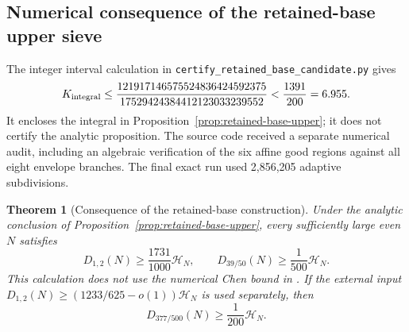 \documentclass[11pt]{article}
\newtheorem{theorem}{Theorem}
\newcommand{\HN}{\mathcal H_N}
\begin{document}
\subsection{Numerical consequence of the retained-base upper sieve}
\label{sec:retained-base-corollary}
The integer interval calculation in
\texttt{certify\_retained\_base\_candidate.py} gives
\[
 K_{\rm integral}\le
 \frac{121917146575524836424592375}{17529424384412123033239552}
 <\frac{1391}{200}=6.955.
\]
It encloses the integral in Proposition~\ref{prop:retained-base-upper};
it does not certify the analytic proposition. The source code received
a separate numerical audit, including an algebraic verification of
the six affine good regions against all eight envelope branches.
The final exact run used 2,856,205 adaptive subdivisions.

\begin{theorem}[Consequence of the retained-base construction]
\label{thm:retained-base-chen}
Under the analytic conclusion of Proposition~\ref{prop:retained-base-upper},
every sufficiently large even $N$ satisfies
\[
 D_{1,2}(N)\ge\frac{1731}{1000}\HN,
 \qquad D_{39/50}(N)\ge\frac1{500}\HN.
\]
This calculation does not use the numerical Chen bound in \cite{Li2026}.
If the external input
$D_{1,2}(N)\ge(1233/625-o(1))\HN$ is used separately, then
\[
 D_{377/500}(N)\ge\frac1{200}\HN.
\]
\end{theorem}
\end{document}
